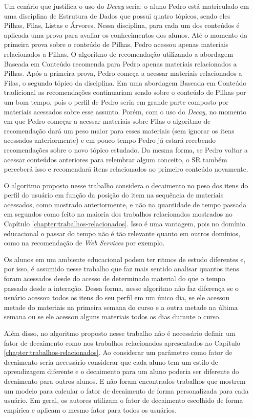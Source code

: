 Um cenário que justifica o uso do \textit{Decay} seria: o aluno Pedro está matriculado em uma disciplina de Estrutura de Dados
que possui quatro tópicos, sendo eles Pilhas, Filas, Listas e Árvores. Nessa disciplina, para cada um dos conteúdos é
aplicada uma prova para avaliar os conhecimentos dos alunos. Até o momento da primeira prova sobre o conteúdo de Pilhas,
Pedro acessou apenas materiais relacionados a Pilhas. O algoritmo de recomendação utilizando a abordagem Baseada em
Conteúdo recomenda para Pedro apenas materiais relacionados a Pilhas. Após a primeira prova, Pedro começa a acessar
materiais relacionados a Filas, o segundo tópico da disciplina. Em uma abordagem Baseada em Conteúdo tradicional as
recomendações continuariam sendo sobre o conteúdo de Pilhas por um bom tempo, pois o perfil de Pedro seria em grande
parte composto por materiais acessados sobre esse assunto. Porém, com o uso do \textit{Decay}, no momento em que Pedro começar a
acessar materiais sobre Filas o algoritmo de recomendação dará um peso maior para esses materiais (sem ignorar os itens
acessados anteriormente) e em pouco tempo Pedro já estará recebendo recomendações sobre o novo tópico estudado. Da mesma
forma, se Pedro voltar a acessar conteúdos anteriores para relembrar algum conceito, o SR também perceberá isso e
recomendará itens relacionados ao primeiro conteúdo novamente.

O algoritmo proposto nesse trabalho considera o decaimento no peso dos itens do perfil do usuário em função da posição
do item na sequência de materiais acessados, como mostrado anteriormente, e não na quantidade de tempo passada em
segundos como feito na maioria dos trabalhos relacionados mostrados no Capítulo \ref{chapter:trabalhos-relacionados}. Isso é uma vantagem, pois no domínio
educacional o passar do tempo não é tão relevante quanto em outros domínios, como na recomendação de \textit{Web Services} por
exemplo.

Os alunos em um ambiente educacional podem ter ritmos de estudo diferentes e, por isso, é assumido nesse trabalho que faz
mais sentido analisar quantos itens foram acessados desde do acesso de determinado material do que o tempo passado desde
a interação. Dessa forma, nesse algoritmo não faz diferença se o usuário acessou todos os itens do seu perfil em um
único dia, se ele acessou metade do materiais na primeira semana do curso e a outra metade na última semana ou se ele
acessou alguns materiais todos os dias durante o curso.

Além disso, no algoritmo proposto nesse trabalho não é necessário definir um fator de decaimento como nos trabalhos
relacionados apresentados no Capítulo \ref{chapter:trabalhos-relacionados}. Ao considerar um parâmetro como fator de decaimento seria necessário considerar
que cada aluno tem um estilo de aprendizagem diferente e o decaimento para um aluno poderia ser diferente do decaimento
para outros alunos. E não foram encontrados trabalhos que mostrem um modelo para calcular o fator de decaimento de forma
personalizada para cada usuário. Em geral, os autores utilizam o fator de decaimento escolhido de forma empírica e
aplicam o mesmo fator para todos os usuários.

